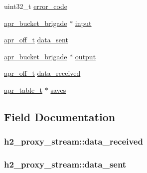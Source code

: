 \begin{DoxyCompactItemize}
\item 
uint32\+\_\+t \hyperlink{structh2__proxy__stream_a1d7b1ed1c8b4a5c5f4228a9acb023455}{error\+\_\+code}
\item 
\hyperlink{structapr__bucket__brigade}{apr\+\_\+bucket\+\_\+brigade} $\ast$ \hyperlink{structh2__proxy__stream_ae59f8f0a0dbcb785cc7cc96c5b198c49}{input}
\item 
\hyperlink{group__apr__platform_ga6938af9075cec15c88299109381aa984}{apr\+\_\+off\+\_\+t} \hyperlink{structh2__proxy__stream_a70d657cfe0f764202b1950ee1afdec61}{data\+\_\+sent}
\item 
\hyperlink{structapr__bucket__brigade}{apr\+\_\+bucket\+\_\+brigade} $\ast$ \hyperlink{structh2__proxy__stream_a0e7be34d42eb99465951836e1f87db69}{output}
\item 
\hyperlink{group__apr__platform_ga6938af9075cec15c88299109381aa984}{apr\+\_\+off\+\_\+t} \hyperlink{structh2__proxy__stream_adcd5371a20cddd7353c4c363d3c7988d}{data\+\_\+received}
\item 
\hyperlink{structapr__table__t}{apr\+\_\+table\+\_\+t} $\ast$ \hyperlink{structh2__proxy__stream_aaf7e0da05e5c84797c2530edff5803b9}{saves}
\end{DoxyCompactItemize}


\subsection{Field Documentation}
\subsubsection[{\texorpdfstring{data\+\_\+received}{data_received}}]{ h2\+\_\+proxy\+\_\+stream\+::data\+\_\+received}\hypertarget{structh2__proxy__stream_adcd5371a20cddd7353c4c363d3c7988d}{}\label{structh2__proxy__stream_adcd5371a20cddd7353c4c363d3c7988d}
\subsubsection[{\texorpdfstring{data\+\_\+sent}{data_sent}}]{ h2\+\_\+proxy\+\_\+stream\+::data\+\_\+sent}\hypertarget{structh2__proxy__stream_a70d657cfe0f764202b1950ee1afdec61}{}\label{structh2__proxy__stream_a70d657cfe0f764202b1950ee1afdec61}
